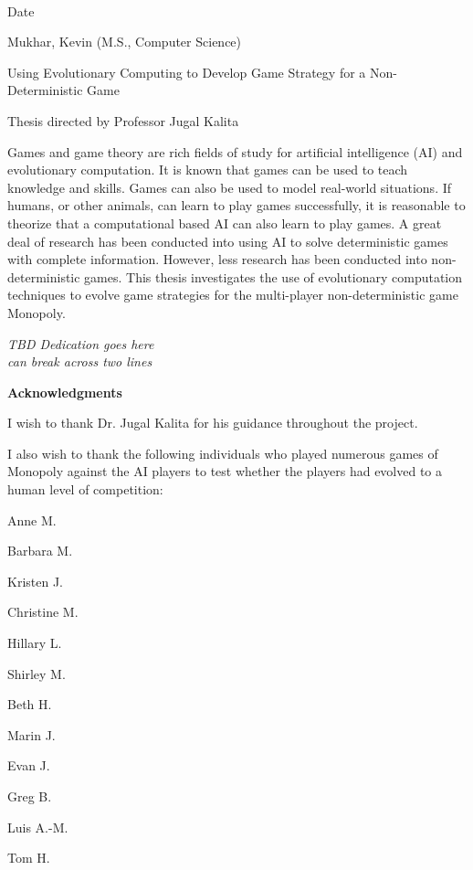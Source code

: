 \begin{flushright}
	\vspace{2.0pc}
	\makebox[2in]{\hrulefill} \\[-1.0pc]
	Date
\end{flushright}


\newpage

\setlength{\parindent}{0in}
Mukhar, Kevin (M.S., Computer Science) 

Using Evolutionary Computing to
Develop Game Strategy for a Non-Deterministic Game 

Thesis directed by Professor Jugal Kalita

\vspace{28pt}
\setlength{\parindent}{.4in}

Games and game theory are rich fields of study for artificial intelligence (AI)
and evolutionary computation. It is known that games can be used to teach
knowledge and skills. Games can also be used to model real-world situations. If
humans, or other animals, can learn to play games successfully, it is
reasonable to theorize that a computational based AI can also learn to play
games. A great deal of research has been conducted into using AI to solve
deterministic games with complete information. However, less research has
been conducted into non-deterministic games. This thesis investigates the use of
evolutionary computation techniques to evolve game strategies for the
multi-player non-deterministic game Monopoly.

\newpage

\parbox{5.0in}{
	\vspace{2.0in}
	\begin{center}
		{\large{\emph{TBD Dedication goes here \\ can break across two lines}}}
	\end{center}
}


\newpage
\begin{center}
	{\large{\bf Acknowledgments}}
\end{center}
\setlength{\parindent}{.4in}

I wish to thank Dr. Jugal Kalita for his guidance throughout the project.

I also wish to thank the following individuals who played numerous games
of Monopoly against the AI players to test whether the players had evolved to a
human level of competition:

Anne M.

Barbara M.

Kristen J.

Christine M.

Hillary L.

Shirley M.

Beth H.

Marin J.

Evan J.

Greg B.

Luis A.-M.

Tom H.